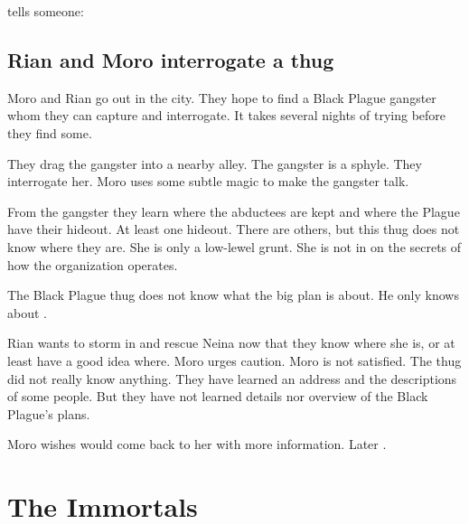 \Psyrex tells someone: 






\subsection{Rian and Moro interrogate a thug}
Moro and Rian go out in the city.
They hope to find a Black Plague gangster whom they can capture and interrogate.
It takes several nights of trying before they find some. 


They drag the gangster into a nearby alley. 
The gangster is a sphyle. 
They interrogate her. 
Moro uses some subtle magic to make the gangster talk. 

From the gangster they learn where the abductees are kept and where the Plague have their hideout.
At least one hideout. 
There are others, but this thug does not know where they are.
She is only a low-lewel grunt. 
She is not in on the secrets of how the organization operates. 

The Black Plague thug does not know what the big plan is about. 
He only knows about . 

Rian wants to storm in and rescue Neina now that they know where she is, or at least have a good idea where. 
Moro urges caution. 
Moro is not satisfied. 
The thug did not really know anything. 
They have learned an address and the descriptions of some people.
But they have not learned details nor overview of the Black Plague's plans. 

Moro wishes \Nasshikerr would come back to her with more information.
Later . 















\section{The Immortals}







